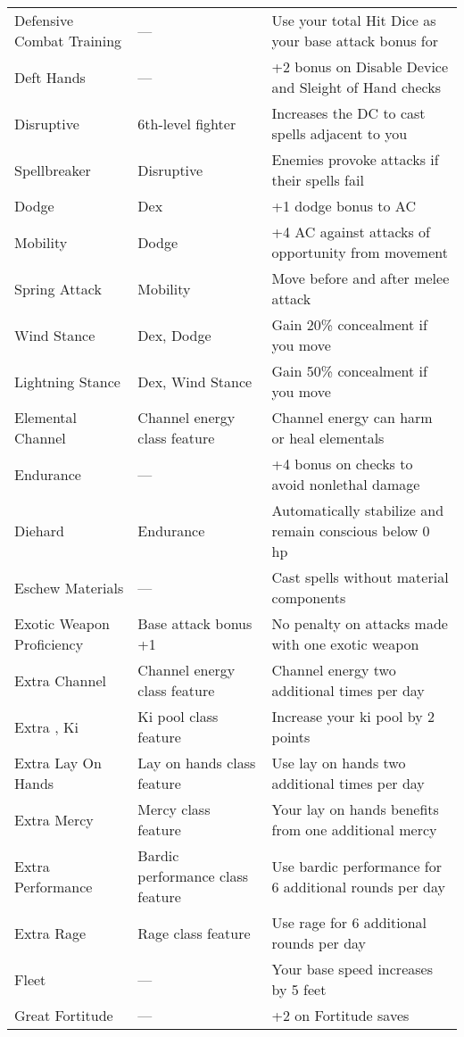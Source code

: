 \begin{table*}[]
\begin{tabularx}{\linewidth}{lXl}
Defensive Combat Training & --- & Use your total Hit Dice as your base attack bonus for \\
Deft Hands & --- & +2 bonus on Disable Device and Sleight of Hand checks\\
Disruptive & 6th-level fighter & Increases the DC to cast spells adjacent to you\\
\quad Spellbreaker & Disruptive & Enemies provoke attacks if their spells fail\\
Dodge & Dex & +1 dodge bonus to AC\\
\quad Mobility & Dodge & +4 AC against attacks of opportunity from movement\\
\quad \quad Spring Attack & Mobility & Move before and after melee attack\\
\quad Wind Stance & Dex, Dodge & Gain 20\% concealment if you move\\
\quad \quad Lightning Stance & Dex, Wind Stance & Gain 50\% concealment if you move\\
Elemental Channel & Channel energy class feature & Channel energy can harm or heal elementals\\
Endurance & --- & +4 bonus on checks to avoid nonlethal damage\\
\quad Diehard & Endurance & Automatically stabilize and remain conscious below 0 hp\\
Eschew Materials & --- & Cast spells without material components\\
Exotic Weapon Proficiency & Base attack bonus +1 & No penalty on attacks made with one exotic weapon\\
Extra Channel & Channel energy class feature & Channel energy two additional times per day\\
Extra , Ki & Ki pool class feature & Increase your ki pool by 2 points\\
Extra Lay On Hands & Lay on hands class feature & Use lay on hands two additional times per day\\
Extra Mercy & Mercy class feature & Your lay on hands benefits from one additional mercy\\
Extra Performance & Bardic performance class feature & Use bardic performance for 6 additional rounds per day\\
Extra Rage & Rage class feature & Use rage for 6 additional rounds per day\\
Fleet & --- & Your base speed increases by 5 feet\\
Great Fortitude & --- & +2 on Fortitude saves\\

\end{tabularx}
\end{table*}
